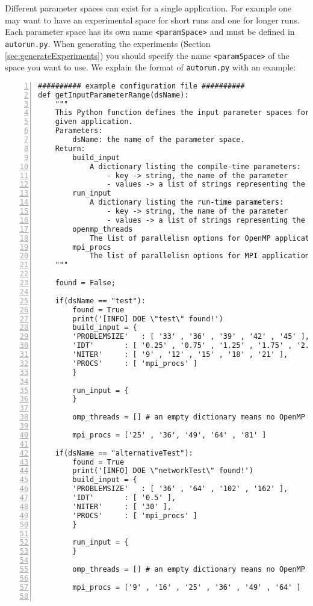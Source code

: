 \documentclass[a4paper, 10pt]{article}
\begin{document}
Different parameter spaces can exist for a single application. For example one may want to have an experimental space for short runs
and one for longer runs.
Each parameter space has its own name \verb!<paramSpace>! and must be defined in \verb!autorun.py!.
When generating the experiments (Section \ref{sec:generateExperiments}) you should specify the name \verb!<paramSpace>! of the space you want to use.
We explain the format of \verb!autorun.py! with an example:
\begin{Verbatim}[obeytabs, tabsize=4, frame=lines, numbers=left]
########## example configuration file ##########
def getInputParameterRange(dsName):
	"""
	This Python function defines the input parameter spaces for the
	given application.
	Parameters:
		dsName: the name of the parameter space.
	Return:
		build_input
			A dictionary listing the compile-time parameters:
				- key -> string, the name of the parameter
				- values -> a list of strings representing the parameter values
		run_input
			A dictionary listing the run-time parameters:
				- key -> string, the name of the parameter
				- values -> a list of strings representing the parameter values
		openmp_threads
			The list of parallelism options for OpenMP applications
		mpi_procs
			The list of parallelism options for MPI applications
	"""

	found = False;
		
	if(dsName == "test"):
		found = True
		print('[INFO] DOE \"test\" found!')
		build_input = {
		'PROBLEMSIZE' 	: [ '33' , '36' , '39' , '42' , '45' ], 
		'IDT'		: [ '0.25' , '0.75' , '1.25' , '1.75' , '2.25' ],
		'NITER'		: [ '9' , '12' , '15' , '18' , '21' ],
		'PROCS'		: [ 'mpi_procs' ] 
		}

		run_input = {
		}

		omp_threads = [] # an empty dictionary means no OpenMP

		mpi_procs = ['25' , '36', '49', '64' , '81' ] 
		
	if(dsName == "alternativeTest"):
		found = True
		print('[INFO] DOE \"networkTest\" found!')
		build_input = {
		'PROBLEMSIZE' 	: [ '36' , '64' , '102' , '162' ], 
		'IDT'		: [ '0.5' ],
		'NITER'		: [ '30' ],
		'PROCS'		: [ 'mpi_procs' ] 
		}

		run_input = {
		}

		omp_threads = [] # an empty dictionary means no OpenMP

		mpi_procs = ['9' , '16' , '25' , '36' , '49' , '64' ] 
		

\end{Verbatim}
\end{document}
